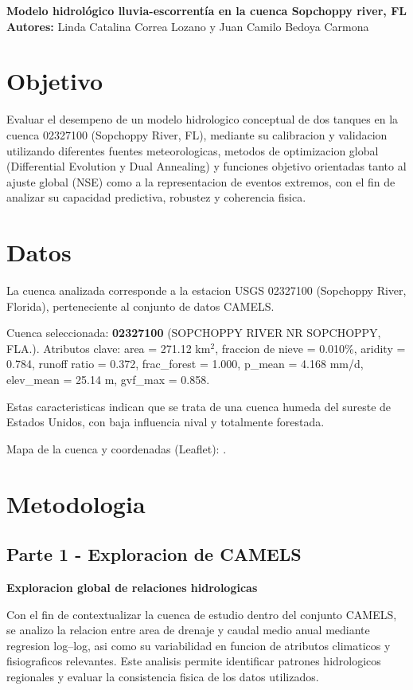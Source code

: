 \documentclass[12pt]{article}
\begin{document}
\begin{center}
{\LARGE \textbf{Modelo hidrológico lluvia-escorrentía en la cuenca Sopchoppy river, FL}}\\[0.4cm]
\textbf{Autores:} Linda Catalina Correa Lozano y Juan Camilo Bedoya Carmona
\end{center}

\section*{Objetivo}
Evaluar el desempeno de un modelo hidrologico conceptual de dos tanques en la cuenca 02327100 (Sopchoppy River, FL), mediante su calibracion y validacion utilizando diferentes fuentes meteorologicas, metodos de optimizacion global (Differential Evolution y Dual Annealing) y funciones objetivo orientadas tanto al ajuste global (NSE) como a la representacion de eventos extremos, con el fin de analizar su capacidad predictiva, robustez y coherencia fisica.

\section*{Datos}
La cuenca analizada corresponde a la estacion USGS 02327100 (Sopchoppy River, Florida), perteneciente al conjunto de datos CAMELS.

Cuenca seleccionada: \textbf{02327100} (SOPCHOPPY RIVER NR SOPCHOPPY, FLA.).
Atributos clave: area = 271.12 km$^2$, fraccion de nieve = 0.010\%, aridity = 0.784, runoff ratio = 0.372, frac\_forest = 1.000, p\_mean = 4.168 mm/d, elev\_mean = 25.14 m, gvf\_max = 0.858.

Estas caracteristicas indican que se trata de una cuenca humeda del sureste de Estados Unidos, con baja influencia nival y totalmente forestada.

Mapa de la cuenca y coordenadas (Leaflet): \texttt{}.

\section*{Metodologia}
\subsection*{Parte 1 - Exploracion de CAMELS}
\textbf{Exploracion global de relaciones hidrologicas}

Con el fin de contextualizar la cuenca de estudio dentro del conjunto CAMELS, se analizo la relacion entre area de drenaje y caudal medio anual mediante regresion log--log, asi como su variabilidad en funcion de atributos climaticos y fisiograficos relevantes. Este analisis permite identificar patrones hidrologicos regionales y evaluar la consistencia fisica de los datos utilizados.
\end{document}
